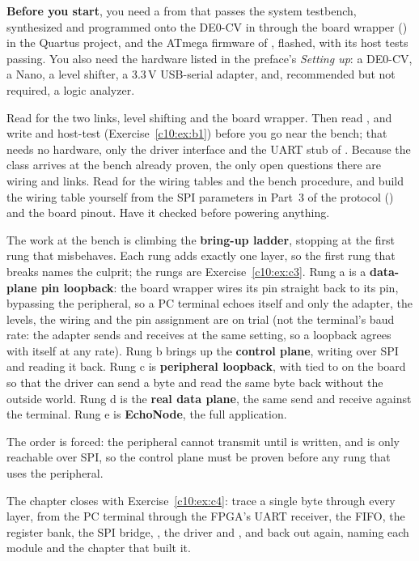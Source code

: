 \textbf{Before you start}, you need a  from  that passes the system
testbench, synthesized and programmed onto the DE0-CV in  through the board wrapper
() in the Quartus project, and the ATmega firmware of , flashed, with
its host tests passing. You also need the hardware listed in the preface's \emph{Setting up}: a
DE0-CV, a Nano, a level shifter, a 3.3\,V USB-serial adapter, and, recommended but not required, a
logic analyzer.

Read  for the two links, level shifting and the board wrapper. Then read
, and write and host-test  (Exercise~\ref{c10:ex:b1})
before you go near the bench; that needs no hardware, only the driver interface and the UART stub of
. Because the class arrives at the bench already proven, the only open questions there are
wiring and links. Read  for the wiring tables and the bench procedure, and
build the wiring table yourself from the SPI parameters in Part~3 of the protocol
() and the board pinout. Have it checked before powering anything.

The work at the bench is climbing the \textbf{bring-up ladder}, stopping at the first rung that
misbehaves. Each rung adds exactly one layer, so the first rung that breaks names the culprit; the
rungs are Exercise~\ref{c10:ex:c3}. Rung a is a \textbf{data-plane pin loopback}: the board wrapper
wires its  pin straight back to its  pin, bypassing the peripheral, so a PC
terminal echoes itself and only the adapter, the levels, the wiring and the pin assignment are on
trial (not the terminal's baud rate: the adapter sends and receives at the same setting, so a loopback agrees with itself at any rate). Rung b brings up the \textbf{control plane}, writing  over
SPI and reading it back. Rung c is \textbf{peripheral loopback}, with  tied to  on
the board so that the driver can send a byte and read the same byte back without the outside world.
Rung d is the \textbf{real data plane}, the same send and receive against the terminal. Rung e is
\textbf{EchoNode}, the full application.

The order is forced: the peripheral cannot transmit until  is written, and
 is only reachable over SPI, so the control plane must be proven before any rung that
uses the peripheral.

The chapter closes with Exercise~\ref{c10:ex:c4}: trace a single byte through every layer, from the
PC terminal through the FPGA's UART receiver, the FIFO, the register bank, the SPI bridge,
, the driver and , and back out again, naming each module and the
chapter that built it.





